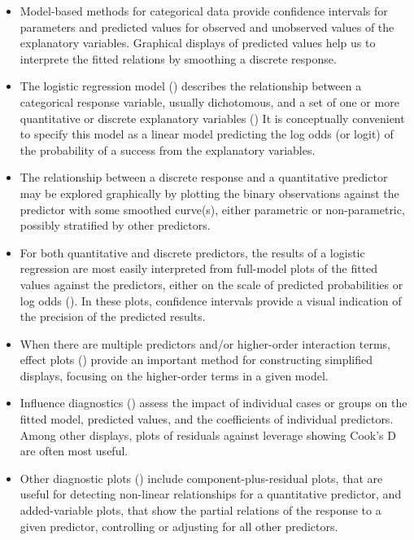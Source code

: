 \begin{itemize}
\item Model-based methods for categorical data provide confidence intervals
for parameters and predicted values for observed and unobserved values
of the explanatory variables.  Graphical displays of predicted values
help us to interprete the fitted relations by smoothing a discrete response.

\item The logistic regression model ()
describes the relationship between 
a categorical response variable, usually dichotomous,
and a set of one or more quantitative or discrete explanatory variables
()
It is conceptually
convenient to specify this model as a linear model predicting
the log odds (or logit) of the probability of a success 
from the explanatory variables.

\item The relationship between a discrete response and a quantitative predictor
may be explored graphically by plotting the binary observations 
against the predictor with some smoothed curve(s), either parametric
or non-parametric, possibly stratified by
other predictors.


\item For both quantitative and discrete predictors, the results of
a logistic regression are most easily interpreted from full-model plots of
the fitted values against the predictors,
either on the scale of predicted probabilities or log odds
().
In these plots, confidence intervals provide a visual indication
of the precision of the predicted results.

\item When there are multiple predictors and/or higher-order 
interaction terms,
effect plots () 
provide an important 
method for constructing simplified displays, focusing on the 
higher-order terms in a given model.

\item Influence diagnostics ()
assess the impact of individual cases or
groups on the fitted model, predicted values, and the coefficients of individual predictors.
Among other displays, plots of residuals against leverage showing Cook's D are
often most useful. 

\item Other diagnostic plots ()
include component-plus-residual plots,
that are useful for detecting non-linear relationships for a quantitative predictor,
and added-variable plots, that show the partial relations of the response to a
given predictor, controlling or adjusting for all other predictors.


\end{itemize}
